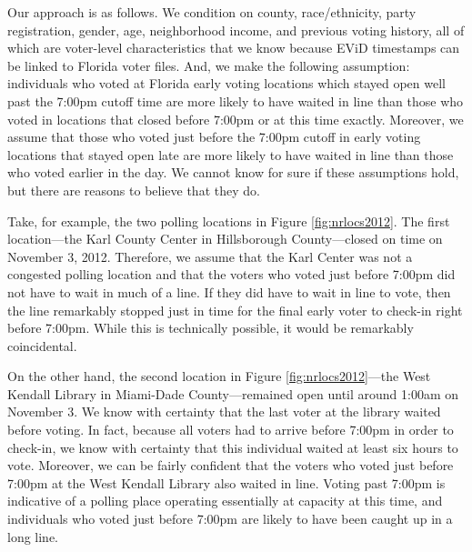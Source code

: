 \documentclass[12pt,titlepage]{article}
\begin{document}



Our approach is as follows. We condition on county, race/ethnicity,
party registration, gender, age, neighborhood income, and previous
voting history, all of which are voter-level characteristics that we
know because EViD timestamps can be linked to Florida voter files.
And, we make the following assumption: individuals who voted at
Florida early voting locations which stayed open well past the 7:00pm
cutoff time are more likely to have waited in line than those who
voted in locations that closed before 7:00pm or at this time
exactly. Moreover, we assume that those who voted just before the
7:00pm cutoff in early voting locations that stayed open late are more
likely to have waited in line than those who voted earlier in the day.
We cannot know for sure if these assumptions hold, but there are
reasons to believe that they do.

Take, for example, the two polling locations in Figure
\ref{fig:nrlocs2012}.  The first location---the Karl County Center in
Hillsborough County---closed on time on November 3, 2012.  Therefore,
we assume that the Karl Center was not a congested polling location
and that the voters who voted just before 7:00pm did not have to wait
in much of a line.  If they did have to wait in line to vote, then the
line remarkably stopped just in time for the final early voter to
check-in right before 7:00pm.  While this is technically possible, it
would be remarkably coincidental.

On the other hand, the second location in Figure
\ref{fig:nrlocs2012}---the West Kendall Library in Miami-Dade
County---remained open until around 1:00am on November 3.  We know
with certainty that the last voter at the library waited before
voting.  In fact, because all voters had to arrive before 7:00pm in
order to check-in, we know with certainty that this individual waited
at least six hours to vote.  Moreover, we can be fairly confident that
the voters who voted just before 7:00pm at the West Kendall Library
also waited in line.  Voting past 7:00pm is indicative of a polling
place operating essentially at capacity at this time, and individuals
who voted just before 7:00pm are likely to have been caught up in a
long line.
\end{document}
